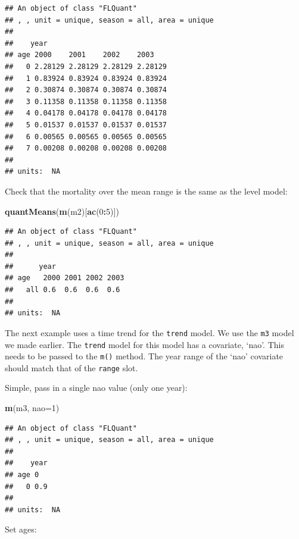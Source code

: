 \documentclass[
]{book}
\newenvironment{Shaded}{\begin{snugshade}}{\end{snugshade}}
\newcommand{\AttributeTok}[1]{\textcolor[rgb]{0.13,0.29,0.53}{#1}}
\newcommand{\DecValTok}[1]{\textcolor[rgb]{0.00,0.00,0.81}{#1}}
\newcommand{\FunctionTok}[1]{\textcolor[rgb]{0.13,0.29,0.53}{\textbf{#1}}}
\newcommand{\NormalTok}[1]{#1}
\newcommand{\SpecialCharTok}[1]{\textcolor[rgb]{0.81,0.36,0.00}{\textbf{#1}}}
\begin{document}
\begin{verbatim}
## An object of class "FLQuant"
## , , unit = unique, season = all, area = unique
## 
##    year
## age 2000    2001    2002    2003   
##   0 2.28129 2.28129 2.28129 2.28129
##   1 0.83924 0.83924 0.83924 0.83924
##   2 0.30874 0.30874 0.30874 0.30874
##   3 0.11358 0.11358 0.11358 0.11358
##   4 0.04178 0.04178 0.04178 0.04178
##   5 0.01537 0.01537 0.01537 0.01537
##   6 0.00565 0.00565 0.00565 0.00565
##   7 0.00208 0.00208 0.00208 0.00208
## 
## units:  NA
\end{verbatim}

Check that the mortality over the mean range is the same as the level model:

\begin{Shaded}
\begin{Highlighting}[]
\FunctionTok{quantMeans}\NormalTok{(}\FunctionTok{m}\NormalTok{(m2)[}\FunctionTok{ac}\NormalTok{(}\DecValTok{0}\SpecialCharTok{:}\DecValTok{5}\NormalTok{)])}
\end{Highlighting}
\end{Shaded}

\begin{verbatim}
## An object of class "FLQuant"
## , , unit = unique, season = all, area = unique
## 
##      year
## age   2000 2001 2002 2003
##   all 0.6  0.6  0.6  0.6 
## 
## units:  NA
\end{verbatim}

The next example uses a time trend for the \texttt{trend} model. We use the \texttt{m3} model we made earlier. The \texttt{trend} model for this model has a covariate, `nao'. This needs to be passed to the \texttt{m()} method. The year range of the `nao' covariate should match that of the \texttt{range} slot.

Simple, pass in a single nao value (only one year):

\begin{Shaded}
\begin{Highlighting}[]
\FunctionTok{m}\NormalTok{(m3, }\AttributeTok{nao=}\DecValTok{1}\NormalTok{)}
\end{Highlighting}
\end{Shaded}

\begin{verbatim}
## An object of class "FLQuant"
## , , unit = unique, season = all, area = unique
## 
##    year
## age 0  
##   0 0.9
## 
## units:  NA
\end{verbatim}

Set ages:
\end{document}
